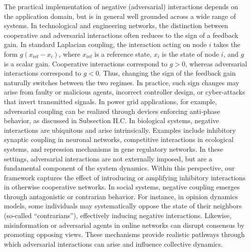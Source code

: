 \documentclass[%
 reprint,
 amsmath,amssymb,
 aip,
]{revtex4-2}
\theoremstyle{italichead}
\theoremstyle{definition}
\begin{document}
{The practical implementation of negative (adversarial) interactions depends on the application domain, but is in general well grounded across a wide range of systems. 
In technological and engineering networks, the distinction between cooperative and adversarial interactions often reduces to the sign of a feedback gain. In standard Laplacian coupling, the interaction acting on node $i$ takes the form $g (x_{\mathrm{ref}} - x_i)$, where $x_{\mathrm{ref}}$ is a reference state, $x_i$ is the state of node $i$, and $g$ is a scalar gain. Cooperative interactions correspond to $g > 0$, whereas adversarial interactions correspond to $g < 0$. Thus, changing the sign of the feedback gain naturally switches between the two regimes. In practice, such sign changes may arise from faulty or malicious agents, incorrect controller design, or cyber-attacks that invert transmitted signals. In power grid applications, for example, adversarial coupling can be realized through devices enforcing anti-phase behavior, as discussed in Subsection II.C.
In biological systems, negative interactions are ubiquitous and arise intrinsically. Examples include inhibitory synaptic coupling in neuronal networks, competitive interactions in ecological systems, and repression mechanisms in gene regulatory networks. In these settings, adversarial interactions are not externally imposed, but are a fundamental component of the system dynamics. Within this perspective, our framework captures the effect of introducing or amplifying inhibitory interactions in otherwise cooperative networks.
In social systems, negative coupling emerges through antagonistic or contrarian behavior. For instance, in opinion dynamics models, some individuals may systematically oppose the state of their neighbors (so-called ``contrarians''), effectively inducing negative interactions. Likewise, misinformation or adversarial agents in online networks can disrupt consensus by promoting opposing views. These mechanisms provide realistic pathways through which adversarial interactions can arise and influence collective dynamics.


}
\end{document}
